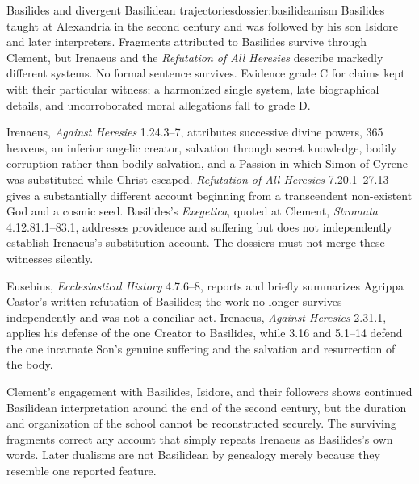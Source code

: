 \begin{heresydossier}{Basilides and divergent Basilidean trajectories}{dossier:basilideanism}
\objectfield Basilides taught at Alexandria in the second century and was followed by his son Isidore and later interpreters. Fragments attributed to Basilides survive through Clement, but Irenaeus and the \emph{Refutation of All Heresies} describe markedly different systems. No formal sentence survives. Evidence grade C for claims kept with their particular witness; a harmonized single system, late biographical details, and uncorroborated moral allegations fall to grade D.

\propositionfield Irenaeus, \emph{Against Heresies} 1.24.3--7, attributes successive divine powers, 365 heavens, an inferior angelic creator, salvation through secret knowledge, bodily corruption rather than bodily salvation, and a Passion in which Simon of Cyrene was substituted while Christ escaped. \emph{Refutation of All Heresies} 7.20.1--27.13 gives a substantially different account beginning from a transcendent non-existent God and a cosmic seed. Basilides's \emph{Exegetica}, quoted at Clement, \emph{Stromata} 4.12.81.1--83.1, addresses providence and suffering but does not independently establish Irenaeus's substitution account. The dossiers must not merge these witnesses silently.

\responsefield Eusebius, \emph{Ecclesiastical History} 4.7.6--8, reports and briefly summarizes Agrippa Castor's written refutation of Basilides; the work no longer survives independently and was not a conciliar act. Irenaeus, \emph{Against Heresies} 2.31.1, applies his defense of the one Creator to Basilides, while 3.16 and 5.1--14 defend the one incarnate Son's genuine suffering and the salvation and resurrection of the body.

\aftermathfield Clement's engagement with Basilides, Isidore, and their followers shows continued Basilidean interpretation around the end of the second century, but the duration and organization of the school cannot be reconstructed securely. The surviving fragments correct any account that simply repeats Irenaeus as Basilides's own words. Later dualisms are not Basilidean by genealogy merely because they resemble one reported feature.
\end{heresydossier}

